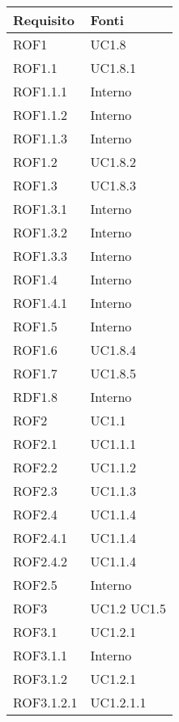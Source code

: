 	\begin{center}

	\def\arraystretch{1.5}
	\bgroup
	\begin{longtable}{| p{4cm} | p{4cm} |}

		\hline
		\textbf{Requisito} & \textbf{Fonti} \\
		\hline


		ROF1  & UC1.8 \\
		\hline
		ROF1.1  &  UC1.8.1 \\
		\hline
		ROF1.1.1  &  Interno \\
		\hline
		ROF1.1.2  &  Interno \\
		\hline
		ROF1.1.3  &  Interno \\
		\hline
		ROF1.2  &  UC1.8.2 \\
		\hline
		ROF1.3  &  UC1.8.3 \\
		\hline
		ROF1.3.1  &  Interno \\
		\hline
		ROF1.3.2  &  Interno \\
		\hline
		ROF1.3.3  &  Interno \\
		\hline
		ROF1.4  &  Interno \\
		\hline
		ROF1.4.1  &  Interno \\
		\hline
		ROF1.5  &  Interno \\
		\hline
		ROF1.6  &  UC1.8.4 \\
		\hline
		ROF1.7  &  UC1.8.5 \\
		\hline
		RDF1.8  &  Interno \\
		\hline
		ROF2  &  UC1.1 \\
		\hline
		ROF2.1  &  UC1.1.1 \\
		\hline
		ROF2.2  &  UC1.1.2 \\
		\hline
		ROF2.3  &  UC1.1.3 \\
		\hline
		ROF2.4  &  UC1.1.4 \\
		\hline
		ROF2.4.1  &  UC1.1.4 \\
		\hline
		ROF2.4.2  &  UC1.1.4 \\
		\hline
		ROF2.5  &  Interno  \\
		\hline
		ROF3  &  UC1.2 \newline UC1.5 \\
		\hline
		ROF3.1  &  UC1.2.1 \\
		\hline
		ROF3.1.1  &  Interno \\
		\hline
		ROF3.1.2  &  UC1.2.1 \\
		\hline
		ROF3.1.2.1  &  UC1.2.1.1 \\

\end{longtable}
\end{center}
